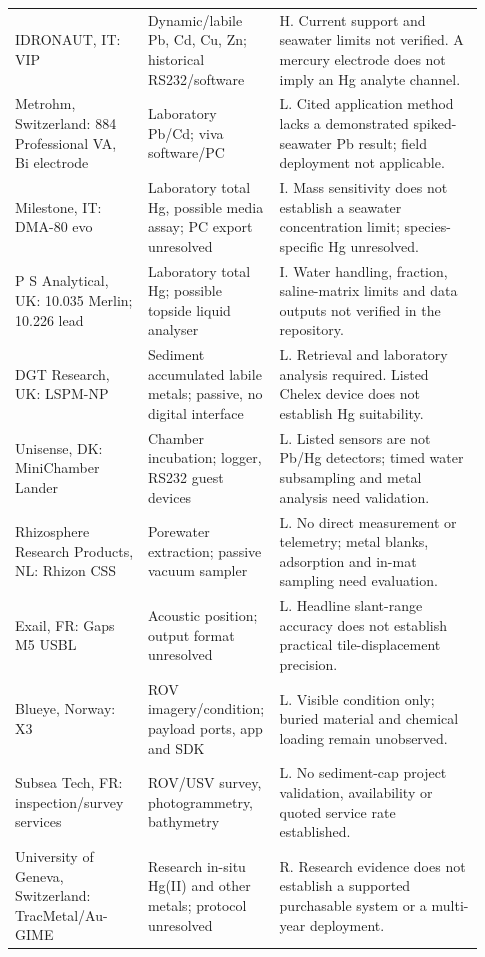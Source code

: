 \begin{longtable}{p{0.28\linewidth}p{0.22\linewidth}p{0.43\linewidth}}
IDRONAUT, IT: VIP & Dynamic/labile Pb, Cd, Cu, Zn; historical RS232/software & H. Current support and seawater limits not verified. A mercury electrode does not imply an Hg analyte channel. \\
Metrohm, Switzerland: 884 Professional VA, Bi electrode & Laboratory Pb/Cd; viva software/PC & L. Cited application method lacks a demonstrated spiked-seawater Pb result; field deployment not applicable. \\
Milestone, IT: DMA-80 evo & Laboratory total Hg, possible media assay; PC export unresolved & I. Mass sensitivity does not establish a seawater concentration limit; species-specific Hg unresolved. \\
P S Analytical, UK: 10.035 Merlin; 10.226 lead & Laboratory total Hg; possible topside liquid analyser & I. Water handling, fraction, saline-matrix limits and data outputs not verified in the repository. \\
DGT Research, UK: LSPM-NP & Sediment accumulated labile metals; passive, no digital interface & L. Retrieval and laboratory analysis required. Listed Chelex device does not establish Hg suitability. \\
Unisense, DK: MiniChamber Lander & Chamber incubation; logger, RS232 guest devices & L. Listed sensors are not Pb/Hg detectors; timed water subsampling and metal analysis need validation. \\
Rhizosphere Research Products, NL: Rhizon CSS & Porewater extraction; passive vacuum sampler & L. No direct measurement or telemetry; metal blanks, adsorption and in-mat sampling need evaluation. \\
Exail, FR: Gaps M5 USBL & Acoustic position; output format unresolved & L. Headline slant-range accuracy does not establish practical tile-displacement precision. \\
Blueye, Norway: X3 & ROV imagery/condition; payload ports, app and SDK & L. Visible condition only; buried material and chemical loading remain unobserved. \\
Subsea Tech, FR: inspection/survey services & ROV/USV survey, photogrammetry, bathymetry & L. No sediment-cap project validation, availability or quoted service rate established. \\
University of Geneva, Switzerland: TracMetal/Au-GIME & Research in-situ Hg(II) and other metals; protocol unresolved & R. Research evidence does not establish a supported purchasable system or a multi-year deployment. \\
\end{longtable}
\endgroup

